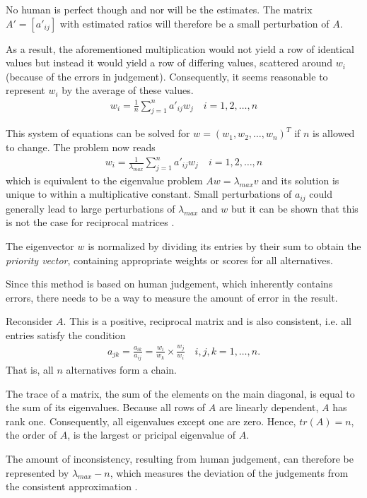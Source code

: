 No human is perfect though and nor will be the estimates. The matrix $A' = \left[a'_{ij}\right]$ with estimated ratios will therefore be a small perturbation of $A$. 

As a result, the aforementioned multiplication would not yield a  row of identical values but instead it would yield a row of differing values, scattered around $w_i$ (because of the errors in judgement). Consequently, it seems reasonable to represent $w_i$ by the average of these values.
\begin{gather}
    w_i = \frac{1}{n} \sum_{j=1}^{n} a'_{ij}w_j \quad i = 1, 2, \ldots, n
\end{gather}

This system of equations can be solved for $w = (w_1, w_2, \ldots, w_n)^T$ if $n$ is allowed to change. The problem now reads
\begin{gather}
    w_i = \frac{1}{\lambda_{max}} \sum_{j=1}^{n} a'_{ij}w_j \quad i = 1, 2, \ldots, n
\end{gather}
which is equivalent to the eigenvalue problem $Aw = \lambda_{max} v$ and its solution is unique to within a multiplicative constant. Small perturbations of $a_{ij}$ could generally lead to large perturbations of $\lambda_{max}$ and $w$ but it can be shown that this is not the case for reciprocal matrices \cite[p.~192~--~197]{Saaty:1980}. 

The eigenvector $w$ is normalized by dividing its entries by their sum to obtain the \emph{priority vector}, containing appropriate weights or scores for all alternatives. 

Since this method is based on human judgement, which inherently contains errors, there needs to be a way to measure the amount of error in the result. 

Reconsider $A$. This is a positive, reciprocal matrix and is also consistent, i.e. all entries satisfy the condition
\begin{gather}
    a_{jk} = \frac{a_{ik}}{a_{ij}} = \frac{w_i}{w_k} \times \frac{w_j}{w_i} \quad i, j, k = 1, \ldots, n.
\end{gather}
That is, all $n$ alternatives form a chain.

The trace of a matrix, the sum of the elements on the main diagonal, is equal to the sum of its eigenvalues. Because all rows of $A$ are linearly dependent, $A$ has rank one. Consequently, all eigenvalues except one are zero. Hence, $tr(A) = n$, the order of $A$, is the largest or pricipal eigenvalue of $A$.

The amount of inconsistency, resulting from human judgement, can therefore be represented by $\lambda_{max} - n$, which measures the deviation of the judgements from the consistent approximation \cite{Saaty:1990}. 

